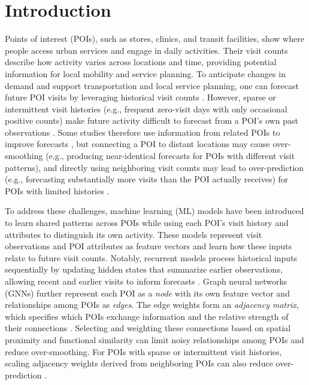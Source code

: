 \documentclass[preprint,authoryear,11pt]{elsarticle}
\def\citep#1{}%
\theoremstyle{definition}
\begin{document}
\section{Introduction}\label{intro}

Points of interest (POIs), such as stores, clinics, and transit facilities, show where people access urban services and engage in daily activities. 
Their visit counts describe how activity varies across locations and time, providing potential information for local mobility and service planning. 
To anticipate changes in demand and support transportation and local service planning, one can forecast future POI visits by leveraging historical visit counts \citep{hajisafi2023learning}.
However, sparse or intermittent visit histories (e.g., frequent zero-visit days with only occasional positive counts) make future activity difficult to forecast from a POI's own past observations \citep{turkmen2021forecasting,zhuang2022uncertainty}. Some studies therefore use information from related POIs to improve forecasts \citep{hajisafi2023learning}, but connecting a POI to distant locations may cause over-smoothing (e.g., producing near-identical forecasts for POIs with different visit patterns), and directly using neighboring visit counts may lead to over-prediction (e.g., forecasting substantially more visits than the POI actually receives) for POIs with limited histories \citep{zhang2026causalpoi}.

To address these challenges, machine learning (ML) models have been introduced to learn shared patterns across POIs while using each POI's visit history and attributes to distinguish its own activity.
These models represent visit observations and POI attributes as feature vectors and learn how these inputs relate to future visit counts.
Notably, recurrent models process historical inputs sequentially by updating hidden states that summarize earlier observations, allowing recent and earlier visits to inform forecasts \citep{hochreiter1997long}. 
Graph neural networks (GNNs) further represent each POI as a \textit{node} with its own feature vector and relationships among POIs as \textit{edges}. 
The edge weights form an \textit{adjacency matrix}, which specifies which POIs exchange information and the relative strength of their connections \citep{hajisafi2023learning}.
Selecting and weighting these connections based on spatial proximity and functional similarity can limit noisy relationships among POIs and reduce over-smoothing.
For POIs with sparse or intermittent visit histories, scaling adjacency weights derived from neighboring POIs can also reduce over-prediction \citep{zhang2026causalpoi}.
\end{document}
